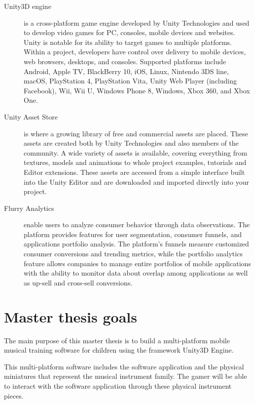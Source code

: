 \begin{description}

\item[Unity3D engine] is a cross-platform game engine developed by Unity Technologies and used to develop video games for PC, consoles, mobile devices and websites. Unity is notable for its ability to target games to multiple platforms. Within a project, developers have control over delivery to mobile devices, web browsers, desktops, and consoles. Supported platforms include Android, Apple TV, BlackBerry 10, iOS, Linux, Nintendo 3DS line, macOS, PlayStation 4, PlayStation Vita, Unity Web Player (including Facebook), Wii, Wii U, Windows Phone 8, Windows, Xbox 360, and Xbox One.~\cite{unitypress2}

\item[Unity Asset Store] is where a growing library of free and commercial assets are placed. These assets are created both by Unity Technologies and also members of the community. A wide variety of assets is available, covering everything from textures, models and animations to whole project examples, tutorials and Editor extensions. These assets are accessed from a simple interface built into the Unity Editor and are downloaded and imported directly into your project.

\item[Flurry Analytics] enable users to analyze consumer behavior through data observations. The platform provides features for user segmentation, consumer funnels, and applications portfolio analysis. The platform's funnels measure customized consumer conversions and trending metrics, while the portfolio analytics feature allows companies to manage entire portfolios of mobile applications with the ability to monitor data about overlap among applications as well as up-sell and cross-sell conversions.~\cite{flurry1}

\end{description}

\section{Master thesis goals}
\label{sec:masterthesisgoals}

The main purpose of this master thesis is to build a multi-platform mobile musical training software for children using the framework Unity3D Engine.

This multi-platform software includes the software application and the physical miniatures that represent the musical instrument family. The gamer will be able to interact with the software application through these physical instrument pieces.

